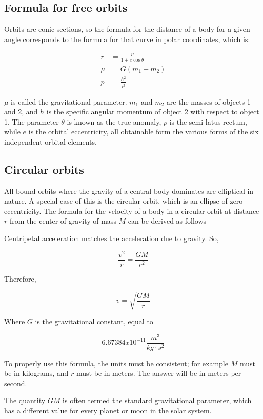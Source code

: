 \documentclass[12pt]{article}
\begin{document}
\subsection{Formula for free orbits}

Orbits are conic sections, so the formula for the distance of a body for a given angle corresponds to the formula for that curve in polar coordinates, which is:

\begin{align*}
  r &= \frac{p}{1+e\cos\theta} \\
  \mu &= G(m_1+m_2) \\
  p &=\frac{h^2}{\mu}
\end{align*}

\(\mu\) is called the gravitational parameter. \(m_1\) and \(m_2\) are the masses of objects 1 and 2, and \(h\) is the specific angular momentum of object 2 with respect to object 1. The parameter \(\theta\) is known as the true anomaly, \(p\) is the semi-latus rectum, while \(e\) is the orbital eccentricity, all obtainable form the various forms of the six independent orbital elements.

\subsection{Circular orbits}

All bound orbits where the gravity of a central body dominates are elliptical in nature. A special case of this is the circular orbit, which is an ellipse of zero eccentricity. The formula for the velocity of a body in a circular orbit at distance \(r\) from the center of gravity of mass \(M\) can be derived as follows -

Centripetal acceleration matches the acceleration due to gravity. So,

\[\frac{v^{2}}{r}=\frac{GM}{r^{2}}\]

Therefore,

\[v=\sqrt{\frac{GM}{r}}\]

Where \(G\) is the gravitational constant, equal to

\[6.67384x10^{-11}\frac{m^{3}}{kg\cdot s^2}\]

To properly use this formula, the units must be consistent; for example \(M\) must be in kilograms, and \(r\) must be in meters. The answer will be in meters per second.

The quantity \(GM\) is often termed the standard gravitational parameter, which has a different value for every planet or moon in the solar system.
\end{document}
